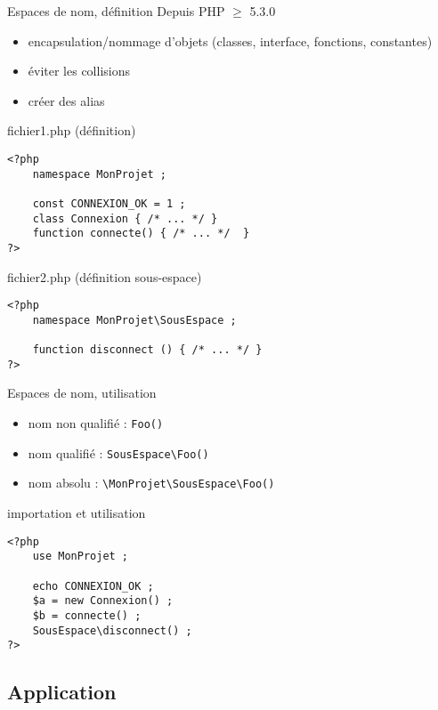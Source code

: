 \begin{frame}[containsverbatim]{Espaces de nom, définition}
	Depuis PHP $\ge$ 5.3.0
	\begin{itemize}
		\item encapsulation/nommage d'objets (classes, interface, fonctions, constantes)
		\item éviter les collisions
		\item créer des alias
	\end{itemize}
	\begin{block}{fichier1.php (définition)}
		\begin{lstlisting}
<?php
	namespace MonProjet ;
	
	const CONNEXION_OK = 1 ;
	class Connexion { /* ... */ }
	function connecte() { /* ... */  }
?>
		\end{lstlisting}
	\end{block}
	\begin{block}{fichier2.php (définition sous-espace)}
		\begin{lstlisting}
<?php
	namespace MonProjet\SousEspace ;

	function disconnect () { /* ... */ }
?>
		\end{lstlisting}
	\end{block}
\end{frame}

\begin{frame}[containsverbatim]{Espaces de nom, utilisation}
	\begin{itemize}
		\item nom non qualifié : \texttt{Foo()}
		\item nom qualifié : \texttt{SousEspace\textbackslash{}Foo()}
		\item nom absolu : \texttt{\textbackslash{}MonProjet\textbackslash{}SousEspace\textbackslash{}Foo()}
	\end{itemize}
	\begin{block}{importation et utilisation}
		\begin{lstlisting}
<?php
	use MonProjet ;
	
	echo CONNEXION_OK ;
	$a = new Connexion() ;
	$b = connecte() ;
	SousEspace\disconnect() ;
?>
		\end{lstlisting}
	\end{block}
\end{frame}


\subsection{Application}

